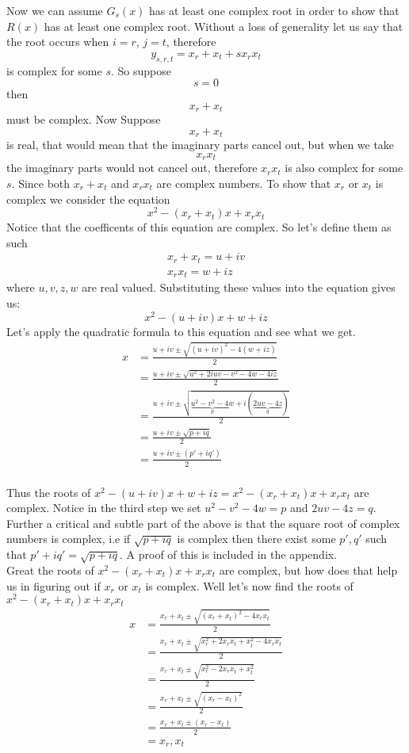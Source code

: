 \documentclass[12pt]{article}
\begin{document}
  Now we can assume $G_s(x)$ has at least one complex root in order to show that $R(x)$ has at least one complex root.  Without a loss of generality let us say that the root occurs when $i=r$, $j=t$, therefore 
$$y_{s,r,t} = x_r + x_t +s x_r x_t$$ 
is complex for some $s$.  So suppose 
$$s=0$$ 
then 
$$x_r + x_t$$ 
must be complex.  Now Suppose 
$$x_r + x_t$$ 
is real, that would mean that the imaginary parts cancel out, but when we take 
$$x_r x_t$$ 
the imaginary parts would not cancel out, therefore $x_r x_t$ is also complex for some $s$.  Since both $x_r+x_t$ and $x_r x_t$ are complex numbers.  To show that $x_r$ or $x_t$ is complex we consider the equation 
$$x^2 - (x_r +x_t)x + x_r x_t$$  Notice that the coefficents of this equation are complex.  So let's define them as such 
\begin{align*}
x_r + x_t = u + iv \\
x_r x_t = w +iz
\end{align*}
where $u,v,z,w$ are real valued.  Substituting these values into the equation gives us:
$$ x^2 -(u+iv)x + w +iz$$
Let's apply the quadratic formula to this equation and see what we get.
\begin{align*}
x &= \frac{u+iv \pm \sqrt{(u+iv)^2-4(w+iz)}}{2} \\
&= \frac{u+iv \pm \sqrt{u^2 +2iuv - v^2 - 4w - 4iz}}{2} \\
&= \frac{u+iv \pm \sqrt{\underbrace{u^2 - v^2 -4w}_p + i (\underbrace{2uv-4z}_q)}}{2}  \\
&= \frac{u+iv \pm \sqrt{p+iq}}{2} \\
&= \frac{u+ iv \pm (p' +iq')}{2} \\
\end{align*}

Thus the roots of $ x^2 -(u+iv)x + w +iz = x^2 - (x_r +x_t)x + x_r x_t$ are complex.  Notice in the third step we set $u^2 - v^2 -4w=p$ and $2uv-4z=q$.  Further a critical and subtle part of the above is that the square root of complex numbers is complex, i.e if $\sqrt{p+iq}$ is complex then there exist some $p', q'$ such that $p' +iq' = \sqrt{p+iq}$.  A proof of this is included in the appendix.\\

Great the roots of $x^2 - (x_r +x_t)x + x_r x_t$ are complex, but how does that help us in figuring out if $x_r$ or $x_t$ is complex.  Well let's now find the roots of $x^2 - (x_r +x_t)x + x_r x_t$
\begin{align*}
x &= \frac{x_r+x_t \pm \sqrt{(x_r+x_t)^2-4x_rx_t}}{2} \\
&= \frac{x_r+x_t \pm \sqrt{x_r^2 +2x_rx_t+x_t^2-4x_rx_t}}{2} \\
&= \frac{x_r+x_t \pm \sqrt{x_r^2 - 2 x_r x_t +x_t^2}}{2} \\
&= \frac{x_r +x_t \pm \sqrt{(x_r-x_t)^2}}{2} \\
&= \frac{x_r + x_t \pm (x_r-x_t)}{2} \\
&= x_r, x_t
\end{align*}
\end{document}
